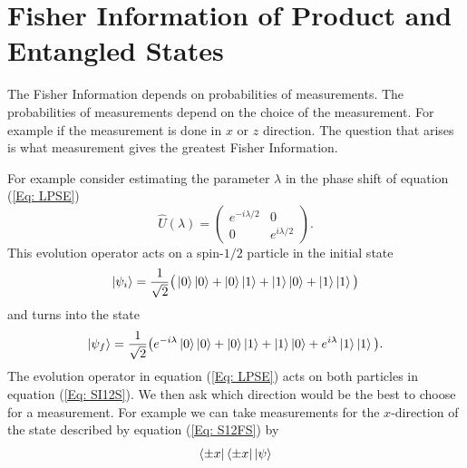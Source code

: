 \documentclass[twocolumn]{article}
\begin{document}
\section*{Fisher Information of Product and Entangled States}
The Fisher Information depends on probabilities of measurements. The probabilities of measurements depend on the choice of the measurement. For example if the measurement is done in $x$ or $z$ direction. The question that arises is what measurement gives the greatest Fisher Information. 

For example consider estimating the parameter $\lambda$ in the phase shift of equation (\ref{Eq: LPSE})
\begin{equation} \label{Eq: LPSE}
\hat{U}(\lambda)=
\begin{pmatrix}
e^{-i\lambda/2} & 0 \\
0 & e^{i\lambda/2}
\end{pmatrix}.
\end{equation}
This evolution operator acts on a spin-$1/2$ particle in the initial state
\begin{equation} \label{Eq: SI12S}
\ket{\psi_i}=\frac{1}{\sqrt{2}}\big(\ket{0}\ket{0}+\ket{0}\ket{1}+\ket{1}\ket{0}+\ket{1}\ket{1}\big)
\end{equation}
and turns into the state
\begin{equation} \label{Eq: S12FS}
\ket{\psi_f}=\frac{1}{\sqrt{2}}\big(e^{-i\lambda}\ket{0}\ket{0}+\ket{0}\ket{1}+\ket{1}\ket{0}+e^{i\lambda}\ket{1}\ket{1}\big).
\end{equation}
The evolution operator in equation (\ref{Eq: LPSE}) acts on both particles in equation (\ref{Eq: SI12S}). 
We then ask which direction would be the best to choose for a measurement. For example we can take measurements for the $x$-direction of the state described by equation (\ref{Eq: S12FS}) by
\begin{equation} \label{Eq: MOS}
\bra{\pm x}\bra{\pm x}\ket{\psi}
\end{equation}
\end{document}
